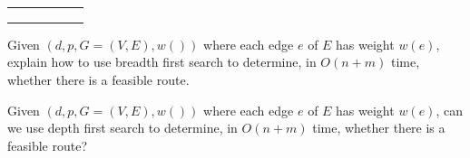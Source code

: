 \documentclass[11pt,fleqn]{exam}
\newenvironment{soln}{\color{solnblue}}{}
\begin{document}
\begin{questions}
\begin{soln}
\begin{center}
\begin{tabular}{|c|c|c|c|c|c|} \hline
\hspace{.5in} &\hspace{.5in} &\hspace{.5in} &\hspace{.5in} &\hspace{.5in} &\hspace{.5in} \\
 &  &  &  &  &  \\
\hspace{.5in} &\hspace{.5in} &\hspace{.5in} &\hspace{.5in} &\hspace{.5in} &\hspace{.5in} \\ \hline
\end{tabular}
\end{center}
\end{soln}

\question[2]
Given $(d,p,G=(V,E), w())$ where each edge $e$ of $E$ has weight $w(e)$, explain how to 
use breadth first search to determine, in $O(n+m)$ time, whether there is a feasible route.

\question[2]
Given $(d,p,G=(V,E), w())$ where each edge $e$ of $E$ has weight $w(e)$, 
can we use depth first search to determine, in $O(n+m)$ time, whether there is a feasible route?

\end{questions}
\end{document}
